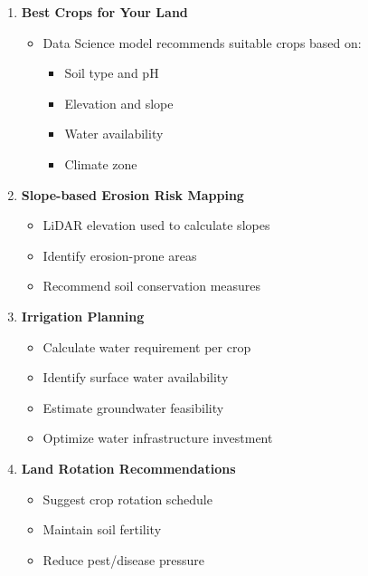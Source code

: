 \begin{enumerate}
    \item \textbf{Best Crops for Your Land}
        \begin{itemize}
            \item Data Science model recommends suitable crops based on:
            \begin{itemize}
                \item Soil type and pH
                \item Elevation and slope
                \item Water availability
                \item Climate zone
            \end{itemize}
        \end{itemize}

    \item \textbf{Slope-based Erosion Risk Mapping}
        \begin{itemize}
            \item LiDAR elevation used to calculate slopes
            \item Identify erosion-prone areas
            \item Recommend soil conservation measures
        \end{itemize}

    \item \textbf{Irrigation Planning}
        \begin{itemize}
            \item Calculate water requirement per crop
            \item Identify surface water availability
            \item Estimate groundwater feasibility
            \item Optimize water infrastructure investment
        \end{itemize}

    \item \textbf{Land Rotation Recommendations}
        \begin{itemize}
            \item Suggest crop rotation schedule
            \item Maintain soil fertility
            \item Reduce pest/disease pressure
        \end{itemize}
\end{enumerate}

